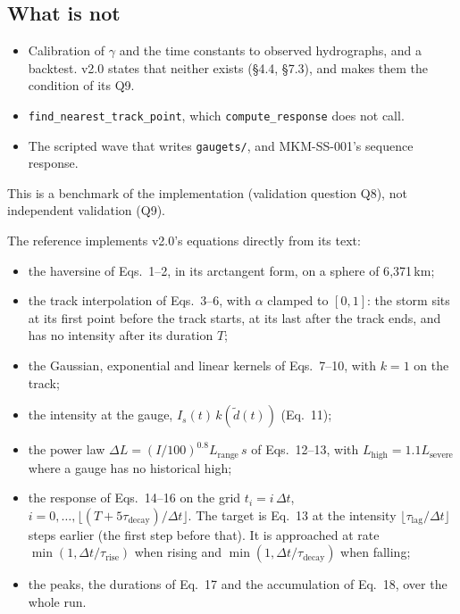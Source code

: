 \documentclass[11pt,a4paper]{article}
\begin{document}
\subsection{What is not}
\begin{itemize}[leftmargin=*,nosep]
\item Calibration of $\gamma$ and the time constants to observed hydrographs, and a
  backtest. v2.0 states that neither exists (\S4.4, \S7.3), and makes them the
  condition of its Q9.
\item \texttt{find\_nearest\_track\_point}, which \texttt{compute\_response} does not
  call.
\item The scripted wave that writes \texttt{gaugets/}, and MKM-SS-001's sequence
  response.
\end{itemize}
This is a benchmark of the implementation (validation question Q8), not independent
validation (Q9).

\mkmframework

The reference implements v2.0's equations directly from its text:
\begin{itemize}[leftmargin=*,nosep]
\item the haversine of Eqs.~1--2, in its arctangent form, on a sphere of 6{,}371\,km;
\item the track interpolation of Eqs.~3--6, with $\alpha$ clamped to $[0,1]$: the storm
  sits at its first point before the track starts, at its last after the track ends, and
  has no intensity after its duration $T$;
\item the Gaussian, exponential and linear kernels of Eqs.~7--10, with $k=1$ on the
  track;
\item the intensity at the gauge, $I_s(t)\,k(\tilde d(t))$ (Eq.~11);
\item the power law $\Delta L=(I/100)^{0.8}L_{\mathrm{range}}\,s$ of Eqs.~12--13, with
  $L_{\mathrm{high}}=1.1L_{\mathrm{severe}}$ where a gauge has no historical high;
\item the response of Eqs.~14--16 on the grid $t_i=i\,\Delta t$,
  $i=0,\ldots,\lfloor(T+5\tau_{\mathrm{decay}})/\Delta t\rfloor$. The target is Eq.~13 at
  the intensity $\lfloor\tau_{\mathrm{lag}}/\Delta t\rfloor$ steps earlier (the first
  step before that). It is approached at rate $\min(1,\Delta t/\tau_{\mathrm{rise}})$
  when rising and $\min(1,\Delta t/\tau_{\mathrm{decay}})$ when falling;
\item the peaks, the durations of Eq.~17 and the accumulation of Eq.~18, over the whole
  run.
\end{itemize}
\end{document}
